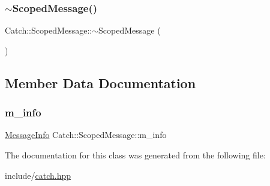 \mbox{\label{classCatch_1_1ScopedMessage_a43190843f9eeb84a0b42b0bc95fdf93a}} 
\subsubsection{\texorpdfstring{$\sim$\+Scoped\+Message()}{~ScopedMessage()}}
{\footnotesize\ttfamily Catch\+::\+Scoped\+Message\+::$\sim$\+Scoped\+Message (\begin{DoxyParamCaption}{ }\end{DoxyParamCaption})}



\subsection{Member Data Documentation}
\mbox{\label{classCatch_1_1ScopedMessage_ae6e1476f389cc6e1586f033b3747b27b}} 
\subsubsection{\texorpdfstring{m\+\_\+info}{m\_info}}
{\footnotesize\ttfamily \mbox{\hyperlink{structCatch_1_1MessageInfo}{Message\+Info}} Catch\+::\+Scoped\+Message\+::m\+\_\+info}



The documentation for this class was generated from the following file\+:\begin{DoxyCompactItemize}
\item 
include/\mbox{\hyperlink{catch_8hpp}{catch.\+hpp}}\end{DoxyCompactItemize}
